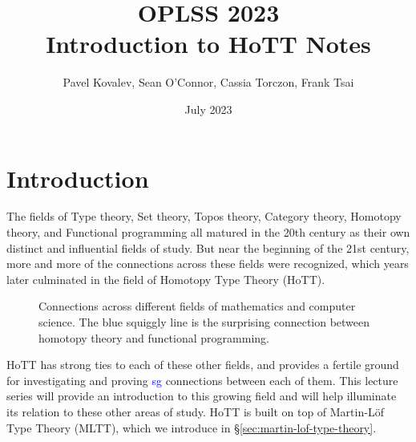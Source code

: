 \documentclass{amsart}
\title[Introduction to HoTT Notes]{OPLSS 2023 \\
Introduction to HoTT Notes}
\author{Pavel Kovalev, Sean O'Connor, Cassia Torczon, Frank Tsai}
\date{July 2023}
\theoremstyle{definition}
\newcommand{\surprising}{\textcolor{blue}{s\uwave{urprisin}g} $\text{}$}
\begin{document}
\maketitle
\tableofcontents

\section{Introduction}
\label{sec:introduction}

The fields of Type theory, Set theory, Topos theory, Category theory, Homotopy theory, and Functional programming all matured in the 20th century as their own distinct and influential fields of study. But near the beginning of the 21st century, more and more of the connections across these fields were recognized, which years later culminated in the field of Homotopy Type Theory (HoTT).

\begin{figure}[h]
    \centering
    
    \caption{Connections across different fields of mathematics and computer science.
    The blue squiggly line is the surprising connection between homotopy theory and functional programming.}
    \label{fig:connections-across-fields}
\end{figure}

HoTT has strong ties to each of these other fields, and provides a fertile ground for investigating and proving \surprising connections between each of them. This lecture series will provide an introduction to this growing field and will help illuminate its relation to these other areas of study.
HoTT is built on top of Martin-L\"{o}f Type Theory (MLTT), which we introduce in \S\ref{sec:martin-lof-type-theory}.
\end{document}
